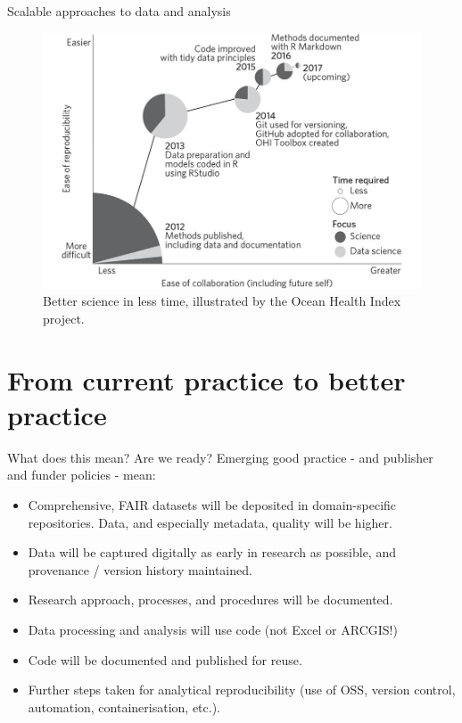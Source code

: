 \documentclass[aspectratio=169, 12pt]{beamer} %
\begin{document}
\begin{frame}{Scalable approaches to data and analysis}
  \begin{figure}[H]
    \centering
        \includegraphics[height=.7\textheight]{figures/Ocean-Health-Index.jpg}
        \caption{Better science in less time, illustrated by the Ocean Health Index project. \cite{Stewart_Lowndes2017-lj}}
        \label{fig:stewart_lowndes}
  \end{figure}
\end{frame}

\section{From current practice to better practice}

\begin{frame}{What does this mean? Are we ready?}
  Emerging good practice - and publisher and funder policies - mean:
    \begin{itemize}[label=\textbullet]
        \item Comprehensive, FAIR datasets will be deposited in domain-specific repositories. Data, and especially metadata, quality will be higher.
        \item Data will be captured digitally as early in research as possible, and provenance / version history maintained.
        \item Research approach, processes, and procedures will be documented.
        \item Data processing and analysis will use code (not Excel or ARCGIS!) 
        \item Code will be documented and published for reuse.
        \item Further steps taken for analytical reproducibility (use of OSS, version control, automation, containerisation, etc.). 
    \end{itemize}
\end{frame}
\end{document}
